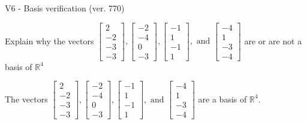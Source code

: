 \begin{exercise}
  \begin{exerciseTitle}V6 - Basis verification (ver. 770)\end{exerciseTitle}
  \begin{exerciseStatement}
    Explain why the vectors \(\left[\begin{array}{r}
2 \\
-2 \\
-3 \\
-3
\end{array}\right] , \left[\begin{array}{r}
-2 \\
-4 \\
0 \\
-3
\end{array}\right] , \left[\begin{array}{r}
-1 \\
1 \\
-1 \\
1
\end{array}\right] , \text{ and } \left[\begin{array}{r}
-4 \\
1 \\
-3 \\
-4
\end{array}\right]\) are or are not a basis of \(\mathbb{R}^4\)	


  \end{exerciseStatement}
  \begin{exerciseAnswer}
   The vectors \(\left[\begin{array}{r}
2 \\
-2 \\
-3 \\
-3
\end{array}\right] , \left[\begin{array}{r}
-2 \\
-4 \\
0 \\
-3
\end{array}\right] , \left[\begin{array}{r}
-1 \\
1 \\
-1 \\
1
\end{array}\right] , \text{ and } \left[\begin{array}{r}
-4 \\
1 \\
-3 \\
-4
\end{array}\right]\) 
  	 are  a basis of \(\mathbb{R}^4\).
  


  \end{exerciseAnswer}
\end{exercise}